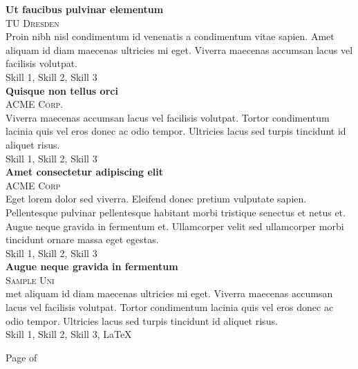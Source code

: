 \documentclass[oneside]{article}
\begin{document}
{\begin{minipage}[t][\dimexpr\textheight-2\fboxrule-2\fboxsep\relax][t]{\dimexpr0.6\textwidth-2\fboxrule-2\fboxsep\relax}
\begin{justify}
        {\large \textbf{Ut faucibus pulvinar elementum}} \\
        {\scshape{}\selectfont\footnotesize TU Dresden } \\
        Proin nibh nisl condimentum id venenatis a condimentum vitae sapien. Amet aliquam id diam maecenas ultricies mi eget. Viverra maecenas accumsan lacus vel facilisis volutpat. \\[1ex]
        Skill 1, Skill 2, Skill 3 \\

        {\large \textbf{Quisque non tellus orci}} \\
        {\scshape{}\selectfont\footnotesize ACME Corp. } \\
        Viverra maecenas accumsan lacus vel facilisis volutpat. Tortor condimentum lacinia quis vel eros donec ac odio tempor. Ultricies lacus sed turpis tincidunt id aliquet risus. \\[1ex]
        Skill 1, Skill 2, Skill 3 \\
        
        {\large \textbf{Amet consectetur adipiscing elit}} \\
        {\scshape{}\selectfont\footnotesize ACME Corp } \\
        Eget lorem dolor sed viverra. Eleifend donec pretium vulputate sapien. Pellentesque pulvinar pellentesque habitant morbi tristique senectus et netus et. Augue neque gravida in fermentum et. Ullamcorper velit sed ullamcorper morbi tincidunt ornare massa eget egestas. \\[1ex]
        Skill 1, Skill 2, Skill 3 \\
        
        {\large \textbf{Augue neque gravida in fermentum}} \\
        {\scshape{}\selectfont\footnotesize Sample Uni } \\
        met aliquam id diam maecenas ultricies mi eget. Viverra maecenas accumsan lacus vel facilisis volutpat. Tortor condimentum lacinia quis vel eros donec ac odio tempor. Ultricies lacus sed turpis tincidunt id aliquet risus. \\[1ex]
        Skill 1, Skill 2, Skill 3, \LaTeX 
        \end{justify}
        \vfill%
        {\hfill\small{}\selectfont Page \thepage of \pageref{LastPage}\hfill}
    \end{minipage}
}
\end{document}
